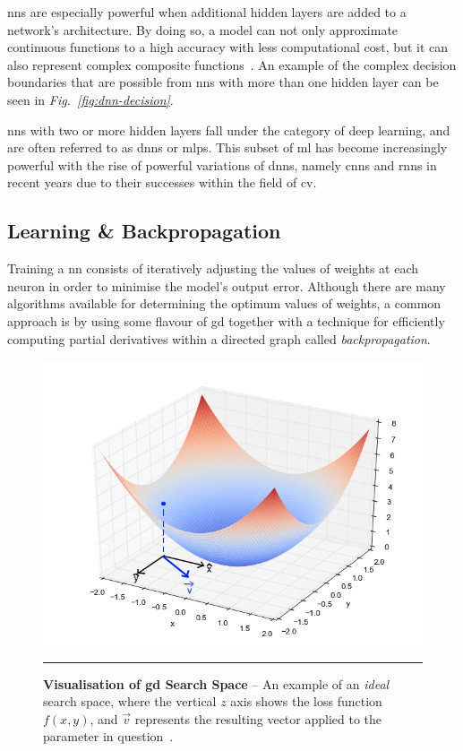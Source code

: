 \glspl{nn} are especially powerful when additional hidden layers are
added to a network's architecture. By doing so, a model can not only approximate continuous functions
to a high accuracy with less computational cost, but it can also represent complex composite 
functions~\citep{sapkota2020}. An example of the complex decision boundaries that are possible from
\glspl{nn} with more than one hidden layer can be seen in \textit{Fig.~\ref{fig:dnn-decision}}.

\glspl{nn} with two or more hidden layers fall under the category of deep learning, and are often referred to as
\Glspl{dnn} or \Glspl{mlp}. This subset
of \gls{ml} has become increasingly powerful with the rise of powerful variations of \glspl{dnn}, namely \Glspl{cnn} and \Glspl{rnn} in recent years
due to their successes within the field of \gls{cv}.

\subsection{Learning \& Backpropagation}
Training a \gls{nn} consists of iteratively adjusting the values of weights at
each neuron in order to minimise the model's output error. Although there
are many algorithms available for determining the optimum values of weights, a common approach
is by using some flavour of \Gls{gd} 
together with a technique for efficiently computing partial derivatives within a directed graph called \textit{backpropagation}.

\begin{figure}[H]
\includegraphics[width=1\textwidth]{media/literature/gd-example.png}
    \rule{35em}{0.5pt}
    \caption[Example visualisation of gradient descent]{\textbf{Visualisation of \gls{gd} Search Space} -- An example of an \textit{ideal} search space, where the vertical $z$ axis shows the loss function $f(x, y)$, and $\vec{v}$ represents the resulting vector applied to the parameter in question~\citep{bendersky2016}.}\label{fig:gd-example}
\end{figure}

